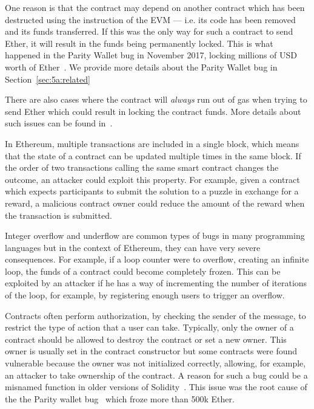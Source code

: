 One reason is that the contract may depend on another contract which has been
destructed using the  instruction of the EVM --- i.e. its code has been removed and its funds transferred. If this was the only way for such a contract to send Ether, it will result in the funds being permanently locked. This is what happened in the Parity Wallet bug in November 2017, locking millions of USD worth of Ether~\cite{Breidenbach}. We provide more details about the Parity Wallet bug in Section~\ref{sec:5a:related}

There are also cases where the contract will \emph{always} run out of gas when trying
to send Ether which could result in locking the contract funds. More details about such issues can be found in~\cite{Grech2018}.

\point{\transactionorder~(\vto)}
In Ethereum, multiple transactions are included in a single block, which means that the state of a contract can be updated multiple times in the same block. If the order of two transactions calling the same smart contract changes the outcome, an attacker could exploit this property. 
For example, given a contract which expects participants to submit the solution to a puzzle in exchange for a reward, a malicious contract owner could reduce the amount of the reward when the transaction is submitted.

\point{\integeroverflow~(\vio)}
Integer overflow and underflow are common types of bugs in many programming languages but in the context of Ethereum, they can have very severe consequences. For example, if a loop counter were to overflow, creating an infinite loop, the funds of a contract could become completely frozen. This can be exploited by an attacker if he has a way of incrementing the number of iterations of the loop, for example, by registering enough users to trigger an overflow.

\point{\unrestrictedaction~(\vua)}
Contracts often perform authorization, by checking the sender of the message, to restrict the type of action that a user can take.
Typically, only the owner of a contract should be allowed to destroy the contract or set a new owner.
This owner is usually set in the contract constructor but some contracts were found vulnerable because the owner was not initialized correctly, allowing, for example, an attacker to take ownership of the contract.
A reason for such a bug could be a misnamed function in older versions of Solidity~\cite{Brent2018,Krupp2018}.
This issue was the root cause of the the Parity wallet bug~\cite{Tsankov2018,Nikolic2018a} which froze more than 500k Ether.

